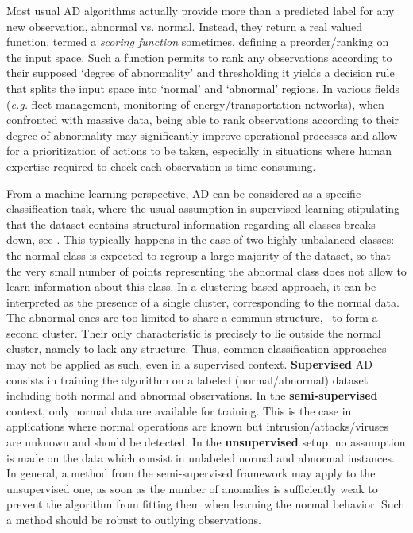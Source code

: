  Most usual AD algorithms actually
provide more than a predicted label for any new observation, abnormal vs. normal. Instead,
they return a real valued function,  termed a \textit{scoring function} sometimes, defining a preorder/ranking on the input space. Such a function permits to rank any observations according to their supposed `degree of abnormality' and thresholding it yields a decision rule that splits the input space into `normal' and `abnormal' regions.
In various fields (\textit{e.g.} fleet management, monitoring of energy/transportation networks), when confronted with massive data, being able to rank observations according to their degree of abnormality may significantly improve operational processes and allow for a prioritization of actions to be taken, especially in situations where human expertise required to check each observation is time-consuming.


From a machine learning perspective, AD can be considered as a specific classification task, where the usual assumption in supervised learning stipulating that the dataset contains structural information regarding all classes breaks down, see \cite{Roberts99}. This typically happens in the case of two highly unbalanced classes: the normal class is expected to regroup a large majority of the dataset, so that the very small number of points representing the abnormal class does not allow to learn information about this class.
In a clustering based approach, it can be
interpreted as the presence of a single cluster, corresponding to the
normal data. The abnormal ones are too limited to share a commun
structure, \ie~to form a second cluster. Their only characteristic is
precisely to lie outside the normal cluster, namely to lack any
structure.  Thus, common classification approaches may not be applied
as such, even in a supervised
context. %
\textbf{Supervised} AD consists in training the algorithm on a labeled (normal/abnormal) dataset including both normal and abnormal observations. In the \textbf{semi-supervised} context, only normal data are available for training. This is the case in applications where normal operations are known but intrusion/attacks/viruses are unknown and should be detected. In the \textbf{unsupervised} setup, no assumption is made on the data which consist in unlabeled normal and abnormal instances. In general, a method from the semi-supervised framework may apply to the unsupervised one, as soon as the number of anomalies is sufficiently weak to prevent the algorithm from fitting them when learning the normal behavior. Such a method should be robust to outlying observations.


